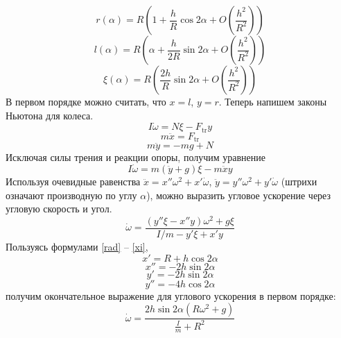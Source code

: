 \documentclass{article}
\begin{document}
	\begin{equation}
		\label{rad}
		r(\alpha) = R\left(1 + \frac{h}{R} \cos{2\alpha} + O\left(\frac{h^2}{R^2}\right)\right)
	\end{equation}
	\begin{equation}
		l(\alpha) = R\left(\alpha + \frac{h}{2R} \sin{2\alpha} + 
		O\left(\frac{h^2}{R^2}\right)\right)
	\end{equation}
	\begin{equation}
		\label{xi}
		\xi(\alpha) = R\left(\frac{2h}{R} \sin{2\alpha} + O\left(\frac{h^2}{R^2}\right)\right)
	\end{equation}
	В первом порядке можно считать, что $x = l$, $y = r$. 
	Теперь напишем законы Ньютона для колеса.
	\begin{equation}
		I\dot{\omega} = N\xi - F_{\mathrm{tr}}y
	\end{equation}
	\begin{equation}
		m\ddot{x} = F_{\mathrm{tr}}
	\end{equation}
	\begin{equation}
		m\ddot{y} = -mg + N
	\end{equation}
	Исключая силы трения и реакции опоры, получим уравнение
	\begin{equation}
		I\dot{\omega} = m(\ddot{y} + g)\xi - m\ddot{x}y
	\end{equation}
	Используя очевидные равенства $\ddot{x} = x''\omega^2 + x'\dot{\omega}$, 
	$\ddot{y} = y''\omega^2 + y'\dot{\omega}$ (штрихи означают
	производную по углу $\alpha$), можно выразить угловое ускорение через
	угловую скорость и угол.
	\begin{equation}	
		\dot{\omega} = \frac{(y''\xi - x''y)\omega^2 + g\xi  }{ I/m - y'\xi + x'y }
	\end{equation}
	Пользуясь формулами \ref{rad} -- \ref{xi}, 	
	\begin{equation}
		x' = R + h\cos{2\alpha}
	\end{equation}
	\begin{equation}
		x'' = -2h\sin{2\alpha}
	\end{equation}
	\begin{equation}
		y' = -2h\sin{2\alpha}
	\end{equation}
	\begin{equation}
		y'' = -4h\cos{2\alpha}
	\end{equation}
	получим окончательное выражение для
	углового ускорения в первом порядке:
	\begin{equation}
		\dot{\omega} = \frac{2h\sin{2\alpha}(R\omega^2  + g)}{\frac{I}{m} + R^2}	
	\end{equation}
\end{document}
